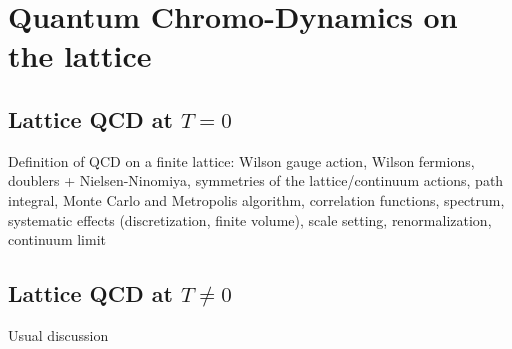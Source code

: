 \chapter{Quantum Chromo-Dynamics on the lattice}
\section{Lattice QCD at $T=0$}
Definition of QCD on a finite lattice: Wilson gauge action, Wilson fermions,
doublers + Nielsen-Ninomiya, symmetries of the lattice/continuum actions, 
path integral, Monte Carlo and Metropolis algorithm,
correlation functions, spectrum, systematic effects (discretization, finite volume),
scale setting, renormalization, continuum limit\\
\section{Lattice QCD at $T\neq 0$}
Usual discussion
